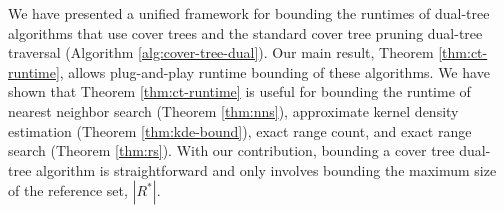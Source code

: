 We have presented a unified framework for bounding the runtimes of dual-tree
algorithms that use cover trees and the standard cover tree pruning dual-tree
traversal (Algorithm \ref{alg:cover-tree-dual}).  Our main result, Theorem
\ref{thm:ct-runtime}, allows plug-and-play runtime bounding of these algorithms.
We have shown that Theorem \ref{thm:ct-runtime} is useful for bounding the
runtime of nearest neighbor search (Theorem \ref{thm:nns}), approximate kernel
density estimation (Theorem \ref{thm:kde-bound}), exact range count, and exact
range search (Theorem \ref{thm:rs}).  With our contribution, bounding a cover
tree dual-tree algorithm is straightforward and only involves bounding the
maximum size of the reference set, $| R^* |$.
